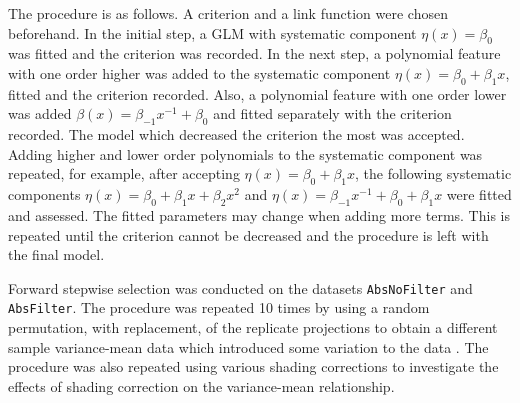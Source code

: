 The procedure is as follows. A criterion and a link function were chosen beforehand. In the initial step, a GLM with systematic component $\eta(x)=\beta_0$ was fitted and the criterion was recorded. In the next step, a polynomial feature with one order higher was added to the systematic component $\eta(x)=\beta_0+\beta_1 x$, fitted and the criterion recorded. Also, a polynomial feature with one order lower was added $\beta(x)=\beta_{-1}x^{-1}+\beta_0$ and fitted separately with the criterion recorded. The model which decreased the criterion the most was accepted. Adding higher and lower order polynomials to the systematic component was repeated, for example, after accepting $\eta(x)=\beta_0+\beta_1 x$, the following systematic components $\eta(x)=\beta_0+\beta_1 x+\beta_2x^2$ and $\eta(x)=\beta_{-1}x^{-1}+\beta_0+\beta_1 x$ were fitted and assessed. The fitted parameters may change when adding more terms. This is repeated until the criterion cannot be decreased and the procedure is left with the final model.

Forward stepwise selection was conducted on the datasets \texttt{AbsNoFilter} and \texttt{AbsFilter}. The procedure was repeated 10 times by using a random permutation, with replacement, of the replicate projections to obtain a different sample variance-mean data which introduced some variation to the data \citep{efron1979bootstrap}. The procedure was also repeated using various shading corrections to investigate the effects of shading correction on the variance-mean relationship.


